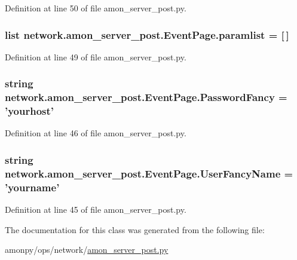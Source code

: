 Definition at line 50 of file amon\-\_\-server\-\_\-post.\-py.

\hypertarget{classnetwork_1_1amon__server__post_1_1_event_page_a11cfef0e995347ffe8571f8be4dbc41a}{
\subsubsection[{paramlist}]{\setlength{\rightskip}{0pt plus 5cm}list network.\-amon\-\_\-server\-\_\-post.\-Event\-Page.\-paramlist = \mbox{[}$\,$\mbox{]}\hspace{0.3cm}{\ttfamily [static]}}}\label{classnetwork_1_1amon__server__post_1_1_event_page_a11cfef0e995347ffe8571f8be4dbc41a}


Definition at line 49 of file amon\-\_\-server\-\_\-post.\-py.

\hypertarget{classnetwork_1_1amon__server__post_1_1_event_page_abf3ce23699c9adfa3508cda1192998c1}{
\subsubsection[{Password\-Fancy}]{\setlength{\rightskip}{0pt plus 5cm}string network.\-amon\-\_\-server\-\_\-post.\-Event\-Page.\-Password\-Fancy = 'yourhost'\hspace{0.3cm}{\ttfamily [static]}}}\label{classnetwork_1_1amon__server__post_1_1_event_page_abf3ce23699c9adfa3508cda1192998c1}


Definition at line 46 of file amon\-\_\-server\-\_\-post.\-py.

\hypertarget{classnetwork_1_1amon__server__post_1_1_event_page_a99e287cd9a0c3fa9663a18101606fe7c}{
\subsubsection[{User\-Fancy\-Name}]{\setlength{\rightskip}{0pt plus 5cm}string network.\-amon\-\_\-server\-\_\-post.\-Event\-Page.\-User\-Fancy\-Name = 'yourname'\hspace{0.3cm}{\ttfamily [static]}}}\label{classnetwork_1_1amon__server__post_1_1_event_page_a99e287cd9a0c3fa9663a18101606fe7c}


Definition at line 45 of file amon\-\_\-server\-\_\-post.\-py.



The documentation for this class was generated from the following file\-:\begin{DoxyCompactItemize}
\item 
amonpy/ops/network/\hyperlink{ops_2network_2amon__server__post_8py}{amon\-\_\-server\-\_\-post.\-py}\end{DoxyCompactItemize}

